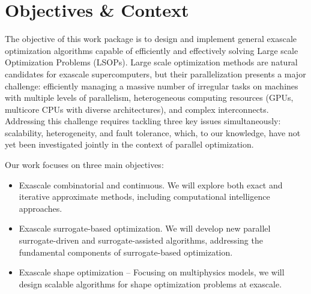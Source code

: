 
\section{Objectives \& Context}
The objective of this work package is to design and implement general exascale optimization algorithms capable of efficiently and effectively solving Large scale Optimization Problems (LSOPs). Large scale optimization methods are natural candidates for exascale supercomputers, but their parallelization presents a major challenge: efficiently managing a massive number of irregular tasks on machines with multiple levels of parallelism, heterogeneous computing resources (GPUs, multicore CPUs with diverse architectures), and complex interconnects. Addressing this challenge requires tackling three key issues simultaneously: scalability, heterogeneity, and fault tolerance, which, to our knowledge, have not yet been investigated jointly in the context of parallel optimization.

Our work focuses on three main objectives:
\begin{itemize}
    \item Exascale combinatorial and continuous. We will explore both exact and iterative approximate methods, including computational intelligence approaches.

    \item Exascale surrogate-based optimization. We will develop new parallel surrogate-driven and surrogate-assisted algorithms, addressing the fundamental components of surrogate-based optimization.

    \item Exascale shape optimization – Focusing on multiphysics models, we will design scalable algorithms for shape optimization problems at exascale.

\end{itemize}

